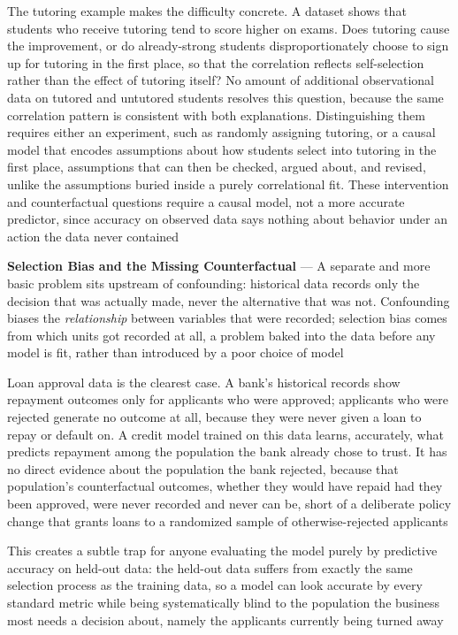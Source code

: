 The tutoring example makes the difficulty concrete. A dataset shows that
students who receive tutoring tend to score higher on exams. Does tutoring cause
the improvement, or do already-strong students disproportionately choose to sign
up for tutoring in the first place, so that the correlation reflects self-selection
rather than the effect of tutoring itself? No amount of additional observational
data on tutored and untutored students resolves this question, because the same correlation
pattern is consistent with both explanations. Distinguishing them requires
either an experiment, such as randomly assigning tutoring, or a causal model
that encodes assumptions about how students select into tutoring in the first
place, assumptions that can then be checked, argued about, and revised, unlike
the assumptions buried inside a purely correlational fit. These intervention and
counterfactual questions require a causal model, not a more accurate predictor, since
accuracy on observed data says nothing about behavior under an action the data never
contained

\textbf{Selection Bias and the Missing Counterfactual} --- A separate and more basic
problem sits upstream of confounding: historical data records only the decision
that was actually made, never the alternative that was not. Confounding biases
the \emph{relationship} between variables that were recorded; selection bias comes
from which units got recorded at all, a problem baked into the data before any model
is fit, rather than introduced by a poor choice of model

Loan approval data is the clearest case. A bank's historical records show repayment
outcomes only for applicants who were approved; applicants who were rejected
generate no outcome at all, because they were never given a loan to repay or default
on. A credit model trained on this data learns, accurately, what predicts
repayment among the population the bank already chose to trust. It has no direct
evidence about the population the bank rejected, because that population's
counterfactual outcomes, whether they would have repaid had they been approved,
were never recorded and never can be, short of a deliberate policy change that grants
loans to a randomized sample of otherwise-rejected applicants

This creates a subtle trap for anyone evaluating the model purely by predictive
accuracy on held-out data: the held-out data suffers from exactly the same selection
process as the training data, so a model can look accurate by every standard
metric while being systematically blind to the population the business most
needs a decision about, namely the applicants currently being turned away

